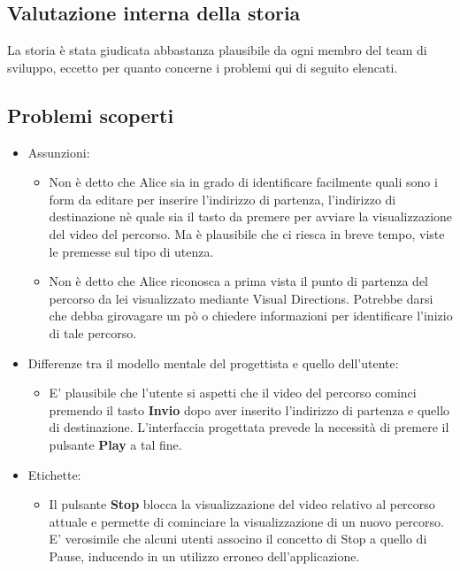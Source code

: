 \documentclass[12pt,a4paper,openright, notitlepage]{report}
\begin{document}
\subsection{Valutazione interna della storia}

La storia è stata giudicata abbastanza plausibile da ogni membro del team di sviluppo, eccetto per quanto concerne i problemi qui di seguito elencati.

\subsection{Problemi scoperti}

\begin{itemize}
	\item Assunzioni:
	\begin{itemize}
		\item Non è detto che Alice sia in grado di identificare facilmente quali sono i form da editare per inserire l’indirizzo di partenza, l’indirizzo di destinazione nè quale sia il tasto da premere per avviare la visualizzazione del video del percorso. Ma è plausibile che ci riesca in breve tempo, viste le premesse sul tipo di utenza.
		\item Non è detto che Alice riconosca a prima vista il punto di partenza del percorso da lei visualizzato mediante Visual Directions. Potrebbe darsi che debba girovagare un pò o chiedere informazioni per identificare l’inizio di tale percorso.
	\end{itemize}
	
	\item Differenze tra il modello mentale del progettista e quello dell’utente:
	\begin{itemize}
		\item E’ plausibile che l’utente si aspetti che il video del percorso cominci premendo il tasto \textbf{Invio} dopo aver inserito l’indirizzo di partenza e quello di destinazione. L’interfaccia progettata prevede la necessità di premere il pulsante \textbf{Play} a tal fine.
	\end{itemize}
	\item Etichette:
	\begin{itemize}
		\item Il pulsante \textbf{Stop} blocca la visualizzazione del video relativo al percorso attuale e permette di cominciare la visualizzazione di un nuovo percorso. E’ verosimile che alcuni utenti associno il concetto di Stop a quello di Pause, inducendo in un utilizzo erroneo dell’applicazione.
	\end{itemize}
\end{itemize}
\end{document}
